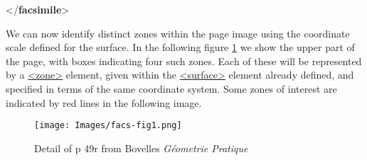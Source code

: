 \begin{shaded}
\hspace*{1em}\mbox{}\newline 
{}\mbox{}\newline 
{</\textbf{facsimile}>}\end{shaded}\egroup\par \noindent  We can now identify distinct zones within the page image using the coordinate scale defined for the surface. In the following figure \ref{facs-fig1} we show the upper part of the page, with boxes indicating four such zones. Each of these will be represented by a \hyperref[TEI.zone]{<zone>} element, given within the \hyperref[TEI.surface]{<surface>} element already defined, and specified in terms of the same coordinate system. Some zones of interest are indicated by red lines in the following image. \begin{figure}[htbp]
\noindent\noindent\texttt{[image: Images/facs-fig1.png]}
\caption{\label{facs-fig1}Detail of p 49r from Bovelles \textit{Géometrie Pratique}}\end{figure}
